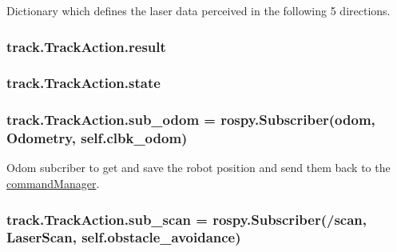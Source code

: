 Dictionary which defines the laser data perceived in the following 5 directions. 

\subsubsection[{\texorpdfstring{result}{result}}]{\setlength{\rightskip}{0pt plus 5cm}track.\+Track\+Action.\+result\hspace{0.3cm}{\ttfamily [static]}}\hypertarget{classtrack_1_1TrackAction_ae62bfb3233b566df94fde636d8d26877}{}\label{classtrack_1_1TrackAction_ae62bfb3233b566df94fde636d8d26877}
\subsubsection[{\texorpdfstring{state}{state}}]{\setlength{\rightskip}{0pt plus 5cm}track.\+Track\+Action.\+state\hspace{0.3cm}{\ttfamily [static]}}\hypertarget{classtrack_1_1TrackAction_a56031d0f135cf2d2f7c950325059f7bd}{}\label{classtrack_1_1TrackAction_a56031d0f135cf2d2f7c950325059f7bd}
\subsubsection[{\texorpdfstring{sub\+\_\+odom}{sub_odom}}]{\setlength{\rightskip}{0pt plus 5cm}track.\+Track\+Action.\+sub\+\_\+odom = rospy.\+Subscriber(\textquotesingle{}odom\textquotesingle{}, Odometry, self.\+clbk\+\_\+odom)\hspace{0.3cm}{\ttfamily [static]}}\hypertarget{classtrack_1_1TrackAction_a4cbc03d130bcf2203bc68f37d02dc4c5}{}\label{classtrack_1_1TrackAction_a4cbc03d130bcf2203bc68f37d02dc4c5}


Odom subcriber to get and save the robot position and send them back to the \hyperlink{namespacecommandManager}{command\+Manager}. 

\subsubsection[{\texorpdfstring{sub\+\_\+scan}{sub_scan}}]{\setlength{\rightskip}{0pt plus 5cm}track.\+Track\+Action.\+sub\+\_\+scan = rospy.\+Subscriber(\textquotesingle{}/scan\textquotesingle{}, Laser\+Scan, self.\+obstacle\+\_\+avoidance)\hspace{0.3cm}{\ttfamily [static]}}\hypertarget{classtrack_1_1TrackAction_ae2e92f43c8c834aba95d6c87241553e6}{}\label{classtrack_1_1TrackAction_ae2e92f43c8c834aba95d6c87241553e6}



